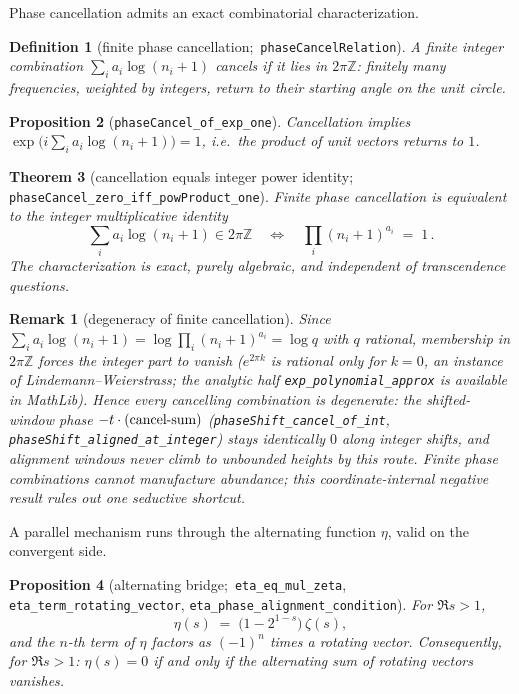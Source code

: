 \documentclass[submission]{jsfds}
\newtheorem{theorem}{Theorem}
\newtheorem{proposition}[theorem]{Proposition}
\newtheorem{definition}[theorem]{Definition}
\newtheorem*{remark}{Remark}
\newcommand{\Lean}[1]{\texttt{#1}}
\begin{document}
Phase cancellation admits an exact combinatorial characterization.

\begin{definition}[finite phase cancellation;\,
\Lean{phaseCancelRelation}]\label{def:cancel}
A finite integer combination $\sum_i a_i\log(n_i+1)$ \emph{cancels} if it lies
in $2\pi\mathbb{Z}$: finitely many frequencies, weighted by integers, return to
their starting angle on the unit circle.
\end{definition}

\begin{proposition}[\Lean{phaseCancel_of_exp_one}]\label{prop:expone}
Cancellation implies $\exp\!\bigl(i\sum_i a_i\log(n_i+1)\bigr)=1$, i.e.\ the
product of unit vectors returns to $1$.
\end{proposition}

\begin{theorem}[cancellation equals integer power identity;\,
\Lean{phaseCancel_zero_iff_powProduct_one}]\label{thm:cancel}
Finite phase cancellation is equivalent to the integer multiplicative identity
\[
  \sum_i a_i\log(n_i+1)\in 2\pi\mathbb{Z}
  \quad\Longleftrightarrow\quad
  \prod_i (n_i+1)^{a_i} \;=\; 1\, .
\]
The characterization is exact, purely algebraic, and independent of
transcendence questions.
\end{theorem}

\begin{remark}[degeneracy of finite cancellation]\label{remark:degen}
Since $\sum_i a_i\log(n_i+1)=\log\prod_i (n_i+1)^{a_i}=\log q$ with $q$
rational, membership in $2\pi\mathbb{Z}$ forces the integer part to vanish
($e^{2\pi k}$ is rational only for $k=0$, an instance of
Lindemann--Weierstrass; the analytic half \Lean{exp_polynomial_approx} is
available in MathLib). Hence every cancelling combination is degenerate:
the shifted-window phase $-t\cdot\textup{(cancel-sum)}$
(\Lean{phaseShift_cancel_of_int}, \Lean{phaseShift_aligned_at_integer}) stays
identically $0$ along integer shifts, and alignment windows never climb to
unbounded heights by this route. Finite phase combinations cannot manufacture
abundance; this coordinate-internal negative result rules out one seductive
shortcut.
\end{remark}

A parallel mechanism runs through the alternating function $\eta$, valid on the
convergent side.

\begin{proposition}[alternating bridge;\,
\Lean{eta_eq_mul_zeta}, \Lean{eta_term_rotating_vector},
\Lean{eta_phase_alignment_condition}]\label{prop:eta}
For $\Re s>1$,
\[
  \eta(s) \;=\; \bigl(1-2^{1-s}\bigr)\,\zeta(s),
\]
and the $n$-th term of $\eta$ factors as $(-1)^{n}$ times a rotating vector.
Consequently, for $\Re s>1$: $\eta(s)=0$ if and only if the alternating sum of
rotating vectors vanishes.
\end{proposition}
\end{document}
